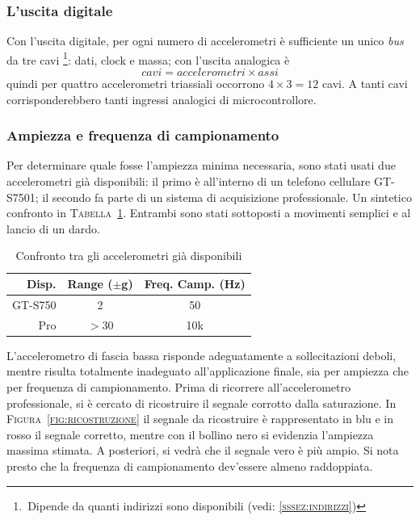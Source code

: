     \subsubsection {L'uscita digitale} \label{sssez:digitale}	
    Con l'uscita digitale, per ogni numero di accelerometri
    è sufficiente un unico \textit{bus} da tre cavi
	\footnote{\,Dipende da quanti indirizzi sono disponibili
	(vedi: \textsc{\ref{sssez:indirizzi}})}:
	dati, clock e massa;
    con l'uscita analogica è
\[
	cavi = accelerometri \times assi
\]
    quindi per quattro accelerometri triassiali occorrono
    \(4 \times 3  = 12\) cavi.
    A tanti cavi corrisponderebbero tanti ingressi analogici di microcontrollore.
    

    \subsubsection {Ampiezza e frequenza di campionamento} \label{sssez:accmax}
    Per determinare quale fosse l'ampiezza minima necessaria,
    sono stati usati due accelerometri già disponibili:
    il primo è all'interno di un telefono cellulare { GT-S7501};
    il secondo fa parte di un sistema di acquisizione professionale.
    Un sintetico confronto in { \textsc{Tabella~\ref{tab:accelerometricasa}}}.
    Entrambi sono stati sottoposti a movimenti semplici e
    al lancio di un dardo.
	\begin{table}
	  \begin{center}
		\caption{Confronto tra gli accelerometri già disponibili}
		\label{tab:accelerometricasa}
		\begin{tabular}{r c c}
Disp.   & Range ($\pm$g) & Freq. Camp. (Hz)\\
			\hline
GT-S750 & 2              & 50 \\
Pro     & $>$30          & 10k \\
			\hline
		\end{tabular}
	  \end{center}
	\end{table}
        
    L'accelerometro di fascia bassa risponde adeguatamente a sollecitazioni deboli,
    mentre risulta totalmente inadeguato all'applicazione finale,
    sia per ampiezza che per frequenza di campionamento.
    Prima di ricorrere all'accelerometro professionale,
    si è cercato di ricostruire il segnale corrotto dalla saturazione.
    In \textsc{Figura~\ref{fig:ricostruzione}}
    il segnale da ricostruire è rappresentato in blu e
    in rosso il segnale corretto, mentre
    con il bollino nero si evidenzia l'ampiezza massima stimata.
    A posteriori, si vedrà che il segnale vero è più ampio.
    Si nota presto che la frequenza di campionamento
    dev'essere almeno raddoppiata.

